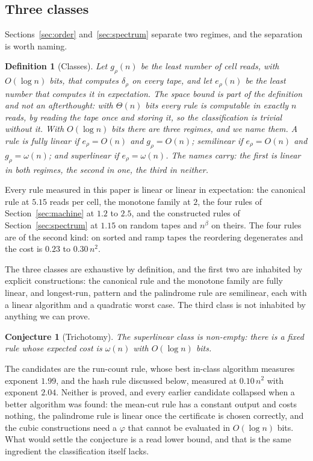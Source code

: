 \documentclass[11pt]{article}
\newtheorem{conjecture}{Conjecture}
\newtheorem{definition}{Definition}
\begin{document}
\subsection{Three classes}\label{sec:classes}

Sections~\ref{sec:order} and~\ref{sec:spectrum} separate two regimes, and the separation is
worth naming.

\begin{definition}[Classes]\label{def:classes}
Let $g_\rho(n)$ be the least number of cell reads, with $O(\log n)$ bits, that computes
$\delta_\rho$ on every tape, and let $e_\rho(n)$ be the least number that computes it in
expectation. The space bound is part of the definition and not an afterthought: with
$\Theta(n)$ bits every rule is computable in exactly $n$ reads, by reading the tape once and
storing it, so the classification is trivial without it. With $O(\log n)$ bits there are
three regimes, and we name them. A rule is \emph{fully linear} if $e_\rho=O(n)$ and
$g_\rho=O(n)$; \emph{semilinear} if $e_\rho=O(n)$ and $g_\rho=\omega(n)$; and
\emph{superlinear} if $e_\rho=\omega(n)$. The names carry: the first is linear in both
regimes, the second in one, the third in neither.
\end{definition}

Every rule measured in this paper is linear or linear in expectation: the canonical rule at
$5.15$ reads per cell, the monotone family at $2$, the four rules of
Section~\ref{sec:machine} at $1.2$ to $2.5$, and the constructed rules of
Section~\ref{sec:spectrum} at $1.15$ on random tapes and $n^\beta$ on theirs. The four
rules are of the second kind: on sorted and ramp tapes the reordering degenerates and the
cost is $0.23$ to $0.30\,n^2$.

The three classes are exhaustive by definition, and the first two are inhabited by explicit
constructions: the canonical rule and the monotone family are fully linear, and longest-run,
pattern and the palindrome rule are semilinear, each with a linear algorithm and a quadratic
worst case. The third class is not inhabited by anything we can prove.

\begin{conjecture}[Trichotomy]\label{conj:trichotomy}
The superlinear class is non-empty: there is a fixed rule whose expected cost is $\omega(n)$
with $O(\log n)$ bits.
\end{conjecture}

The candidates are the run-count rule, whose best in-class algorithm measures exponent
$1.99$, and the hash rule discussed below, measured at $0.10\,n^2$ with exponent $2.04$.
Neither is proved, and every earlier candidate collapsed when a better algorithm was found:
the mean-cut rule has a constant output and costs nothing, the palindrome rule is linear once
the certificate is chosen correctly, and the cubic constructions need a $\varphi$ that cannot
be evaluated in $O(\log n)$ bits. What would settle the conjecture is a read lower bound, and
that is the same ingredient the classification itself lacks.
\end{document}
